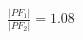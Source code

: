 \documentclass[preview]{standalone}
\begin{document}
\begin{align*}
\frac{|PF_1|}{|PF_2|} = 1.08
\end{align*}
\end{document}
